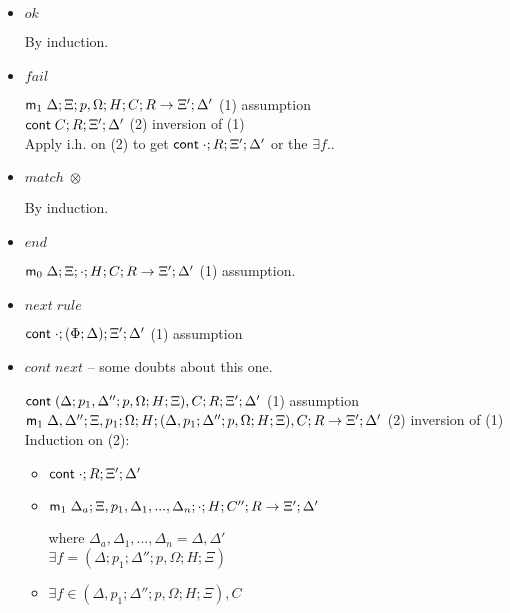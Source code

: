 \begin{itemize}
   \item $ok$
   
   By induction.
   
   \item $fail$
   
   $\mathsf{m}_1 \; \Delta; \Xi; p, \Omega; H; C; R \rightarrow \Xi'; \Delta'$ \hfill (1) assumption \\
   $\mathsf{cont} \; C; R; \Xi'; \Delta'$ \hfill (2) inversion of (1) \\
   Apply i.h. on (2) to get $\mathsf{cont} \; \cdot; R; \Xi'; \Delta'$ or the $\exists f.$.
   
   \item $match \; \otimes$
   
   By induction.
   
   \item $end$
   
   $\mathsf{m}_0 \; \Delta; \Xi; \cdot; H; C; R \rightarrow \Xi'; \Delta'$ \hfill (1) assumption.\\
   
   \item $next \; rule$
   
   $\mathsf{cont} \; \cdot; (\Phi; \Delta); \Xi'; \Delta'$ \hfill (1) assumption \\
   
   \item $cont \; next$ -- some doubts about this one.
   
   $\mathsf{cont} \; (\Delta; p_1, \Delta''; p, \Omega; H; \Xi), C; R; \Xi'; \Delta'$ \hfill (1) assumption \\
   $\mathsf{m}_1 \; \Delta, \Delta''; \Xi, p_1;  \Omega; H; (\Delta, p_1; \Delta''; p, \Omega; H; \Xi), C; R \rightarrow \Xi'; \Delta'$ \hfill (2) inversion of (1)\\
   Induction on (2):
   
   \begin{itemize}
      \item $\mathsf{cont} \; \cdot; R; \Xi'; \Delta'$
      
      \item $\mathsf{m}_1 \; \Delta_a; \Xi, p_1, \Delta_1, ..., \Delta_n; \cdot; H; C''; R \rightarrow \Xi'; \Delta'$ 
      
      where $\Delta_a, \Delta_1, ..., \Delta_n = \Delta, \Delta'$ \\
      
      $\exists f = (\Delta; p_1; \Delta''; p, \Omega; H; \Xi)$
      
      \item $\exists f \in (\Delta, p_1; \Delta''; p, \Omega; H; \Xi), C$
      

\end{itemize}
\end{itemize}
